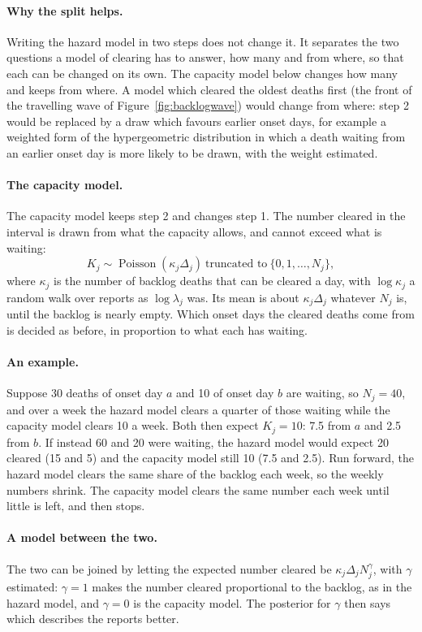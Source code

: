 \documentclass[11pt,a4paper]{article}
\newcommand{\pois}{\operatorname{Poisson}}
\begin{document}
\paragraph{Why the split helps.} Writing the hazard model in two steps does
not change it. It separates the two questions a model of clearing has to
answer, how many and from where, so that each can be changed on its own. The
capacity model below changes how many and keeps from where. A model which
cleared the oldest deaths first (the front of the travelling wave of
Figure~\ref{fig:backlogwave}) would change from where: step 2 would be
replaced by a draw which favours earlier onset days, for example a weighted
form of the hypergeometric distribution in which a death waiting from an
earlier onset day is more likely to be drawn, with the weight estimated.

\paragraph{The capacity model.} The capacity model keeps step 2 and changes
step 1. The number cleared in the interval is drawn from what the capacity
allows, and cannot exceed what is waiting:
\[
K_j\sim\pois(\kappa_j\Delta_j)\ \text{truncated to}\ \{0,1,\dots,N_j\},
\]
where $\kappa_j$ is the number of backlog deaths that can be cleared a day,
with $\log\kappa_j$ a random walk over reports as $\log\lambda_j$ was. Its mean
is about $\kappa_j\Delta_j$ whatever $N_j$ is, until the backlog is nearly
empty. Which onset days the cleared deaths come from is decided as before,
in proportion to what each has waiting.

\paragraph{An example.} Suppose 30 deaths of onset day $a$ and 10 of onset
day $b$ are waiting, so $N_j=40$, and over a week the hazard model clears a
quarter of those waiting while the capacity model clears 10 a week. Both then
expect $K_j=10$: 7.5 from $a$ and 2.5 from $b$. If instead 60 and 20 were
waiting, the hazard model would expect 20 cleared (15 and 5) and the capacity
model still 10 (7.5 and 2.5). Run forward, the hazard model clears the same
share of the backlog each week, so the weekly numbers shrink. The capacity
model clears the same number each week until little is left, and then stops.

\paragraph{A model between the two.} The two can be joined by letting the
expected number cleared be $\kappa_j\Delta_j N_j^{\gamma}$, with
$\gamma$ estimated: $\gamma=1$ makes the number cleared proportional to the
backlog, as in the hazard model, and $\gamma=0$ is the capacity model. The posterior for
$\gamma$ then says which describes the reports better.
\end{document}
